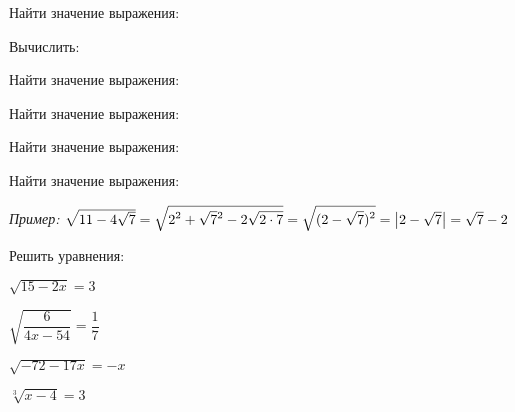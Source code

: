 \begin{listofex}
	\item Найти значение выражения:
	\begin{enumcols}[itemcolumns=3]
		\item {}
		\item {}
		\item {}
		\item {}
		\item {}
		\item {}
		\item {}
	\end{enumcols}
	\item Вычислить:
	\begin{enumcols}[itemcolumns=3]
		\item {}
		\item {}
		\item {}
	\end{enumcols}
	\item Найти значение выражения:
	\begin{enumcols}[itemcolumns=2]
		\item {}
		\item {}
		\item {}
	\end{enumcols}
	\item Найти значение выражения:
	\begin{enumcols}[itemcolumns=1]
		\item {}
		\item {}
	\end{enumcols}
	\item {}
	\item Найти значение выражения:
	\begin{enumcols}[itemcolumns=1]
		\item {}
		\item {}
	\end{enumcols}
	\item Найти значение выражения:
	
	\textit{Пример:} \( \sqrt{11-4\sqrt{7}}=\sqrt{\displaystyle2\mathstrut^2+\sqrt{7}\mathstrut^2-2\sqrt{2\cdot7}}=\sqrt{\displaystyle(2-\sqrt{7})^2}=\left|2-\sqrt{7}\right|=\sqrt{7} - 2 \)
	\begin{enumcols}[itemcolumns=2]
		\item {}
		\item {}
	\end{enumcols}
	\item Решить уравнения:
	\begin{enumcols}[itemcolumns=2]
		\item \( \sqrt{15-2x}=3 \)
		\item \( \sqrt{\dfrac{6}{4x-54}}=\dfrac{1}{7} \)
		\item \( \sqrt{-72-17x}=-x \)
		\item \( \sqrt[3]{x-4}=3 \)
	\end{enumcols}
\end{listofex}
